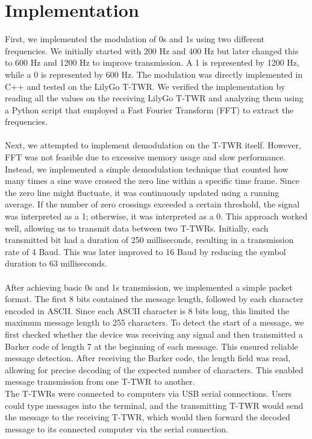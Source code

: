 \section{Implementation}
First, we implemented the modulation of 0s and 1s using two different frequencies. We initially started with 200 Hz and 400 Hz but later changed this to 600 Hz and 1200 Hz to improve transmission. A 1 is represented by 1200 Hz, while a 0 is represented by 600 Hz. The modulation was directly implemented in C++ and tested on the LilyGo T-TWR. We verified the implementation by reading all the values on the receiving LilyGo T-TWR and analyzing them using a Python script that employed a Fast Fourier Transform (FFT) to extract the frequencies.
\\ \\
Next, we attempted to implement demodulation on the T-TWR itself. However, FFT was not feasible due to excessive memory usage and slow performance. Instead, we implemented a simple demodulation technique that counted how many times a sine wave crossed the zero line within a specific time frame. Since the zero line might fluctuate, it was continuously updated using a running average. If the number of zero crossings exceeded a certain threshold, the signal was interpreted as a 1; otherwise, it was interpreted as a 0. This approach worked well, allowing us to transmit data between two T-TWRs. Initially, each transmitted bit had a duration of 250 milliseconds, resulting in a transmission rate of 4 Baud. This was later improved to 16 Baud by reducing the symbol duration to 63 milliseconds.
\\ \\
After achieving basic 0s and 1s transmission, we implemented a simple packet format. The first 8 bits contained the message length, followed by each character encoded in ASCII. Since each ASCII character is 8 bits long, this limited the maximum message length to 255 characters. To detect the start of a message, we first checked whether the device was receiving any signal and then transmitted a Barker code of length 7 at the beginning of each message. This ensured reliable message detection. After receiving the Barker code, the length field was read, allowing for precise decoding of the expected number of characters. This enabled message transmission from one T-TWR to another.
\\ 
The T-TWRs were connected to computers via USB serial connections. Users could type messages into the terminal, and the transmitting T-TWR would send the message to the receiving T-TWR, which would then forward the decoded message to its connected computer via the serial connection.

